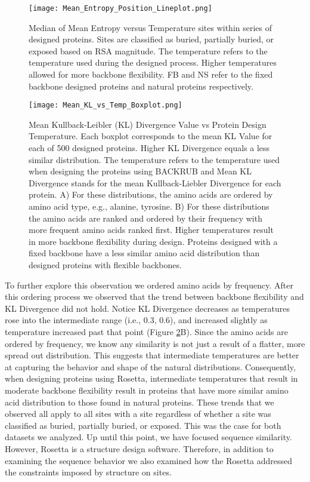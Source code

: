 \documentclass[12pt]{article}
\begin{document}
\begin{figure}[H]
\centerline{\texttt{[image: Mean\_Entropy\_Position\_Lineplot.png]}}
\caption{Median of Mean Entropy versus Temperature sites within series of designed proteins.  Sites are classified as buried, partially buried, or exposed based on RSA magnitude. The temperature refers to the temperature used during the designed process. Higher temperatures allowed for more backbone flexibility. FB and NS refer to the fixed backbone designed proteins and natural proteins respectively.}
\label{Duncan_Position_Entropy}
\end{figure}
 

\begin{figure}[H]
\centerline{\texttt{[image: Mean\_KL\_vs\_Temp\_Boxplot.png]}}
\caption{Mean Kullback-Leibler (KL) Divergence Value vs Protein Design Temperature. Each boxplot corresponds to the mean KL Value for each of 500 designed proteins. Higher KL Divergence  equals a less similar distribution. The temperature refers to the temperature used when designing the proteins using BACKRUB and Mean KL Divergence stands for the mean Kullback-Liebler Divergence for each protein.  A) For these distributions, the amino acids are ordered by amino acid type, e.g., alanine, tyrosine. B) For these distributions the amino acids are ranked and ordered by their frequency with more frequent amino acids ranked first. Higher temperatures result in more backbone flexibility during design. Proteins designed with a fixed backbone have a less similar amino acid distribution than designed proteins with flexible backbones.}
\label{AADisFig1}
\end{figure}

\par To further explore this observation we ordered amino acids by frequency. After this ordering process we observed that the trend between backbone flexibility and KL Divergence did not hold. Notice KL Divergence decreases as temperatures rose into the intermediate range (i.e., 0.3, 0.6), and increased slightly as temperature increased past that point (Figure \ref{AADisFig1}B). Since the amino acids are ordered by frequency, we know any similarity is not just a result of a flatter, more spread out distribution. This suggests that intermediate temperatures are better at capturing the behavior and shape of the natural distributions. Consequently, when designing proteins using Rosetta, intermediate temperatures that result in moderate backbone flexibility result in proteins that have more similar amino acid distribution to those found in natural proteins. These trends that we observed all apply to all sites with a site regardless of whether a site was classified as buried, partially buried, or exposed. This was the case for both datasets we analyzed.  Up until this point, we have focused sequence similarity. However, Rosetta is a structure design software. Therefore, in addition to examining the sequence behavior we also examined how the Rosetta addressed the constraints imposed by structure on sites. 
\end{document}
